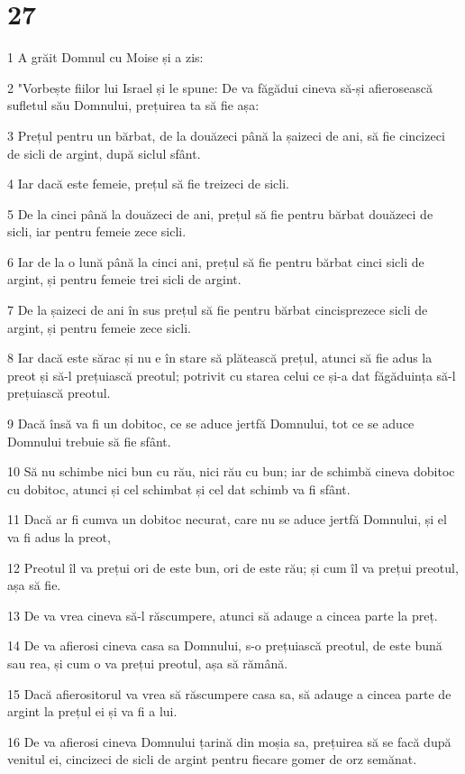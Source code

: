 \chapter{27}

\par 1 A grăit Domnul cu Moise și a zis:
\par 2 "Vorbește fiilor lui Israel și le spune: De va făgădui cineva să-și afierosească sufletul său Domnului, prețuirea ta să fie așa:
\par 3 Prețul pentru un bărbat, de la douăzeci până la șaizeci de ani, să fie cincizeci de sicli de argint, după siclul sfânt.
\par 4 Iar dacă este femeie, prețul să fie treizeci de sicli.
\par 5 De la cinci până la douăzeci de ani, prețul să fie pentru bărbat douăzeci de sicli, iar pentru femeie zece sicli.
\par 6 Iar de la o lună până la cinci ani, prețul să fie pentru bărbat cinci sicli de argint, și pentru femeie trei sicli de argint.
\par 7 De la șaizeci de ani în sus prețul să fie pentru bărbat cincisprezece sicli de argint, și pentru femeie zece sicli.
\par 8 Iar dacă este sărac și nu e în stare să plătească prețul, atunci să fie adus la preot și să-l prețuiască preotul; potrivit cu starea celui ce și-a dat făgăduința să-l prețuiască preotul.
\par 9 Dacă însă va fi un dobitoc, ce se aduce jertfă Domnului, tot ce se aduce Domnului trebuie să fie sfânt.
\par 10 Să nu schimbe nici bun cu rău, nici rău cu bun; iar de schimbă cineva dobitoc cu dobitoc, atunci și cel schimbat și cel dat schimb va fi sfânt.
\par 11 Dacă ar fi cumva un dobitoc necurat, care nu se aduce jertfă Domnului, și el va fi adus la preot,
\par 12 Preotul îl va prețui ori de este bun, ori de este rău; și cum îl va prețui preotul, așa să fie.
\par 13 De va vrea cineva să-l răscumpere, atunci să adauge a cincea parte la preț.
\par 14 De va afierosi cineva casa sa Domnului, s-o prețuiască preotul, de este bună sau rea, și cum o va prețui preotul, așa să rămână.
\par 15 Dacă afierositorul va vrea să răscumpere casa sa, să adauge a cincea parte de argint la prețul ei și va fi a lui.
\par 16 De va afierosi cineva Domnului țarină din moșia sa, prețuirea să se facă după venitul ei, cincizeci de sicli de argint pentru fiecare gomer de orz semănat.
